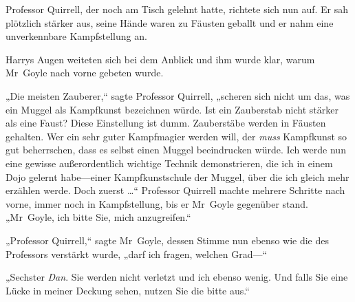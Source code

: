 Professor Quirrell, der noch am Tisch gelehnt hatte, richtete sich nun auf. Er sah plötzlich stärker aus, seine Hände waren zu Fäusten geballt und er nahm eine unverkennbare Kampfstellung an.

Harrys Augen weiteten sich bei dem Anblick und ihm wurde klar, warum Mr~Goyle nach vorne gebeten wurde.

„Die meisten Zauberer,“ sagte Professor Quirrell, „scheren sich nicht um das, was ein Muggel als Kampfkunst bezeichnen würde. Ist ein Zauberstab nicht stärker als eine Faust? Diese Einstellung ist dumm. Zauberstäbe werden in Fäusten gehalten. Wer ein sehr guter Kampfmagier werden will, der \emph{muss} Kampfkunst so gut beherrschen, dass es selbst einen Muggel beeindrucken würde. Ich werde nun eine gewisse außerordentlich wichtige Technik demonstrieren, die ich in einem Dojo gelernt habe—einer Kampfkunstschule der Muggel, über die ich gleich mehr erzählen werde. Doch zuerst …“ Professor Quirrell machte mehrere Schritte nach vorne, immer noch in Kampfstellung, bis er Mr~Goyle gegenüber stand. „Mr~Goyle, ich bitte Sie, mich anzugreifen.“

„Professor Quirrell,“ sagte Mr~Goyle, dessen Stimme nun ebenso wie die des Professors verstärkt wurde, „darf ich fragen, welchen Grad—“

„Sechster \emph{Dan}. Sie werden nicht verletzt und ich ebenso wenig. Und falls Sie eine Lücke in meiner Deckung sehen, nutzen Sie die bitte aus.“

